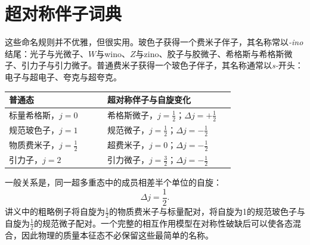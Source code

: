 \begin{classroomqa}
\end{classroomqa}

\section{超对称伴子词典}

这些命名规则并不优雅，但很实用。玻色子获得一个费米子伴子，其名称常以\emph{-ino}结尾：光子与光微子、\(W\)与wino、\(Z\)与zino、胶子与胶微子、希格斯与希格斯微子、引力子与引力微子。普通费米子获得一个玻色子伴子，其名称通常以\emph{s-}开头：电子与超电子、夸克与超夸克。

\begin{center}
\begin{tabular}{@{}>{\raggedright\arraybackslash}p{0.40\linewidth}>{\raggedright\arraybackslash}p{0.52\linewidth}@{}}
\toprule
普通态 & 超对称伴子与自旋变化\\
\midrule
标量希格斯，\(j=0\) & 希格斯微子，\(j=\tfrac12\)；\(\Delta j=+\tfrac12\)\\
规范玻色子，\(j=1\) & 规范微子，\(j=\tfrac12\)；\(\Delta j=-\tfrac12\)\\
物质费米子，\(j=\tfrac12\) & 超费米子，\(j=0\)；\(\Delta j=-\tfrac12\)\\
引力子，\(j=2\) & 引力微子，\(j=\tfrac32\)；\(\Delta j=-\tfrac12\)\\
\bottomrule
\end{tabular}
\end{center}

一般关系是，同一超多重态中的成员相差半个单位的自旋：
\begin{equation}
\Delta j=\frac12.
\end{equation}
讲义中的粗略例子将自旋为\(\tfrac12\)的物质费米子与标量配对，将自旋为1的规范玻色子与自旋为\(\tfrac12\)的规范微子配对。一个完整的相互作用模型在对称性破缺后可以使各态混合，因此物理的质量本征态不必保留这些最简单的名称。

\begin{classroomqa}
\end{classroomqa}


